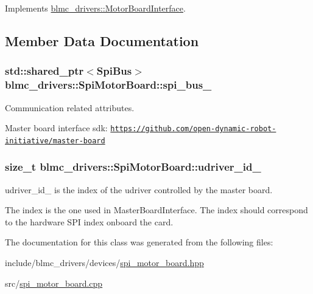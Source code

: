 Implements \hyperlink{classblmc__drivers_1_1MotorBoardInterface_a3ace57ba3e09b9b3120d09303ff39a61}{blmc\+\_\+drivers\+::\+Motor\+Board\+Interface}.



\subsection{Member Data Documentation}
\subsubsection[{\texorpdfstring{spi\+\_\+bus\+\_\+}{spi_bus_}}]{\setlength{\rightskip}{0pt plus 5cm}std\+::shared\+\_\+ptr$<${\bf Spi\+Bus}$>$ blmc\+\_\+drivers\+::\+Spi\+Motor\+Board\+::spi\+\_\+bus\+\_\+\hspace{0.3cm}{\ttfamily [private]}}\hypertarget{classblmc__drivers_1_1SpiMotorBoard_a767abb6f687ed8bf7fef873ab892eaf7}{}\label{classblmc__drivers_1_1SpiMotorBoard_a767abb6f687ed8bf7fef873ab892eaf7}


Communication related attributes. 

Master board interface sdk\+: \href{https://github.com/open-dynamic-robot-initiative/master-board}{\tt https\+://github.\+com/open-\/dynamic-\/robot-\/initiative/master-\/board} 
\subsubsection[{\texorpdfstring{udriver\+\_\+id\+\_\+}{udriver_id_}}]{\setlength{\rightskip}{0pt plus 5cm}size\+\_\+t blmc\+\_\+drivers\+::\+Spi\+Motor\+Board\+::udriver\+\_\+id\+\_\+\hspace{0.3cm}{\ttfamily [private]}}\hypertarget{classblmc__drivers_1_1SpiMotorBoard_a4b865479722dbecec8ebb66d6b93ecae}{}\label{classblmc__drivers_1_1SpiMotorBoard_a4b865479722dbecec8ebb66d6b93ecae}


udriver\+\_\+id\+\_\+ is the index of the udriver controlled by the master board. 

The index is the one used in Master\+Board\+Interface. The index should correspond to the hardware S\+PI index onboard the card. 

The documentation for this class was generated from the following files\+:\begin{DoxyCompactItemize}
\item 
include/blmc\+\_\+drivers/devices/\hyperlink{spi__motor__board_8hpp}{spi\+\_\+motor\+\_\+board.\+hpp}\item 
src/\hyperlink{spi__motor__board_8cpp}{spi\+\_\+motor\+\_\+board.\+cpp}\end{DoxyCompactItemize}
